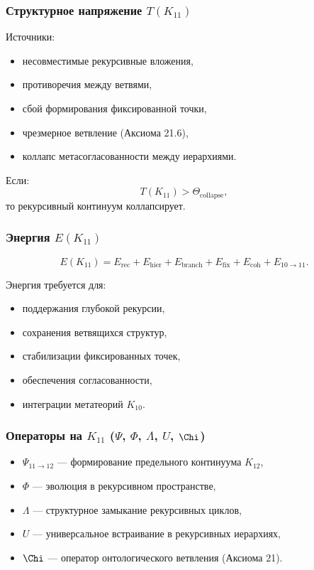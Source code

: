 \subsubsection{Структурное напряжение $T(K_{11})$}

Источники:
\begin{itemize}
    \item несовместимые рекурсивные вложения,
    \item противоречия между ветвями,
    \item сбой формирования фиксированной точки,
    \item чрезмерное ветвление (Аксиома 21.6),
    \item коллапс метасогласованности между иерархиями.
\end{itemize}

Если:
\[
T(K_{11}) > \Theta_{\mathrm{collapse}},
\]
то рекурсивный континуум коллапсирует.

\subsubsection{Энергия $E(K_{11})$}

\[
E(K_{11})=
E_{\mathrm{rec}}+
E_{\mathrm{hier}}+
E_{\mathrm{branch}}+
E_{\mathrm{fix}}+
E_{\mathrm{coh}}+
E_{10\to11}.
\]

Энергия требуется для:
\begin{itemize}
    \item поддержания глубокой рекурсии,
    \item сохранения ветвящихся структур,
    \item стабилизации фиксированных точек,
    \item обеспечения согласованности,
    \item интеграции метатеорий $K_{10}$.
\end{itemize}

\subsubsection{Операторы на $K_{11}$ ($\Psi$, $\Phi$, $\Lambda$, $U$, $\Chi$)}

\begin{itemize}
    \item $\Psi_{11\to12}$ — формирование предельного континуума $K_{12}$,
    \item $\Phi$ — эволюция в рекурсивном пространстве,
    \item $\Lambda$ — структурное замыкание рекурсивных циклов,
    \item $U$ — универсальное встраивание в рекурсивных иерархиях,
    \item $\Chi$ — оператор онтологического ветвления (Аксиома 21).
\end{itemize}


